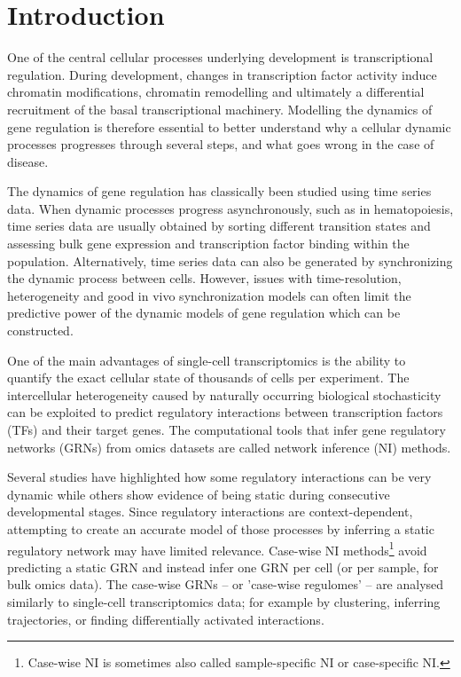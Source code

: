 
\section{Introduction}

One of the central cellular processes underlying development is transcriptional regulation. During development, changes in transcription factor activity induce chromatin modifications, chromatin remodelling and ultimately a differential recruitment of the basal transcriptional machinery\cite{coulon_eukaryotictranscriptionaldynamics_2013}. Modelling the dynamics of gene regulation is therefore essential to better understand why a cellular dynamic processes progresses through several steps, and what goes wrong in the case of disease.

The dynamics of gene regulation has classically been studied using time series data\cite{bar-joseph_studyingmodellingdynamic_2012}. When dynamic processes progress asynchronously, such as in hematopoiesis, time series data are usually obtained by sorting different transition states and assessing bulk gene expression and transcription factor binding within the population\cite{novershtern_denselyinterconnectedtranscriptional_2011, may_dynamicanalysisgene_2013, jojic_identificationtranscriptionalregulators_2013, goode_dynamicgeneregulatory_2016}. Alternatively, time series data can also be generated by synchronizing the dynamic process between cells. However, issues with time-resolution, heterogeneity and good in vivo synchronization models can often limit the predictive power of the dynamic models of gene regulation which can be constructed\cite{bar-joseph_studyingmodellingdynamic_2012}.

One of the main advantages of single-cell transcriptomics is the ability to quantify the exact cellular state of thousands of cells per experiment. The intercellular heterogeneity caused by naturally occurring biological stochasticity \cite{padovan-merhar_usingvariabilitygene_2013} can be exploited to predict regulatory interactions between transcription factors (TFs) and their target genes. The computational tools that infer gene regulatory networks (GRNs) from omics datasets are called network inference (NI) methods.

Several studies have highlighted how some regulatory interactions can be very dynamic while others show evidence of being static during consecutive developmental stages\cite{moignard_characterizationtranscriptionalnetworks_2013, pina_singlecellnetworkanalysis_2015}. 
Since regulatory interactions are context-dependent\cite{papp_genomewideanalysiscontextdependence_2005}, attempting to create an accurate model of those processes by inferring a static regulatory network may have limited relevance.
Case-wise NI methods\footnote{Case-wise NI is sometimes also called sample-specific NI or case-specific NI.} avoid predicting a static GRN and instead infer one GRN per cell (or per sample, for bulk omics data).
The case-wise GRNs -- or 'case-wise regulomes' -- are analysed similarly to single-cell transcriptomics data; for example by clustering, inferring trajectories, or finding differentially activated interactions. 

